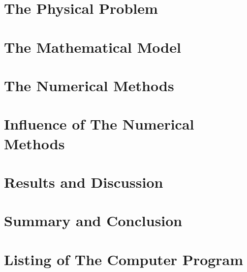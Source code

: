 \documentclass[11pt, a4paper]{article}
\begin{document}
\section{The Physical Problem}

\section{The Mathematical Model}

\section{The Numerical Methods}

\section{Influence of The Numerical Methods}

\section{Results and Discussion}

\section{Summary and Conclusion}

\appendix
\section{Listing of The Computer Program}
\end{document}

